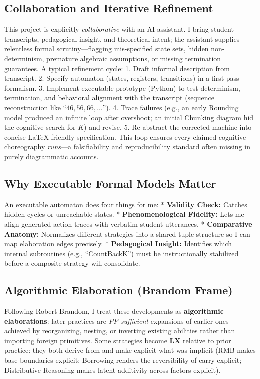\documentclass[
]{article}
\begin{document}
\subsection{Collaboration and Iterative
Refinement}\label{collaboration-and-iterative-refinement}

This project is explicitly \emph{collaborative} with an AI assistant. I
bring student transcripts, pedagogical insight, and theoretical intent;
the assistant supplies relentless formal scrutiny---flagging
mis-specified state sets, hidden non-determinism, premature algebraic
assumptions, or missing termination guarantees. A typical refinement
cycle: 1. Draft informal description from transcript. 2. Specify
automaton (states, registers, transitions) in a first-pass formalism. 3.
Implement executable prototype (Python) to test determinism,
termination, and behavioral alignment with the transcript (sequence
reconstruction like ``\(46, 56, 66, \dots\)''). 4. Trace failures (e.g.,
an early Rounding model produced an infinite loop after overshoot; an
initial Chunking diagram hid the cognitive search for \(K\)) and revise.
5. Re-abstract the corrected machine into concise LaTeX-friendly
specification. This loop ensures every claimed cognitive choreography
\emph{runs}---a falsifiability and reproducibility standard often
missing in purely diagrammatic accounts.

\subsection{Why Executable Formal Models
Matter}\label{why-executable-formal-models-matter}

An executable automaton does four things for me: * \textbf{Validity
Check:} Catches hidden cycles or unreachable states. *
\textbf{Phenomenological Fidelity:} Lets me align generated action
traces with verbatim student utterances. * \textbf{Comparative Anatomy:}
Normalizes different strategies into a shared tuple structure so I can
map elaboration edges precisely. * \textbf{Pedagogical Insight:}
Identifies which internal subroutines (e.g., ``CountBackK'') must be
instructionally stabilized before a composite strategy will consolidate.

\subsection{Algorithmic Elaboration (Brandom
Frame)}\label{algorithmic-elaboration-brandom-frame}

Following Robert Brandom, I treat these developments as
\textbf{algorithmic elaborations}: later practices are
\emph{PP-sufficient} expansions of earlier ones---achieved by
reorganizing, nesting, or inverting existing abilities rather than
importing foreign primitives. Some strategies become \textbf{LX}
relative to prior practice: they both derive from and make explicit what
was implicit (RMB makes base boundaries explicit; Borrowing renders the
reversibility of carry explicit; Distributive Reasoning makes latent
additivity across factors explicit).
\end{document}
